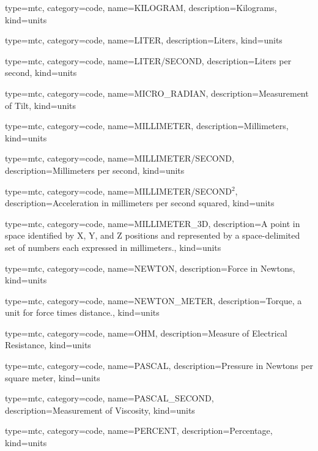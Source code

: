 {
  type=mtc,
  category=code,
  name={KILOGRAM},
  description={Kilograms},
  kind={units}
}


{
  type=mtc,
  category=code,
  name={LITER},
  description={Liters},
  kind={units}
}


{
  type=mtc,
  category=code,
  name={LITER/SECOND},
  description={Liters per second},
  kind={units}
}


{
  type=mtc,
  category=code,
  name={MICRO\_RADIAN},
  description={Measurement of Tilt},
  kind={units}
}


{
  type=mtc,
  category=code,
  name={MILLIMETER},
  description={Millimeters},
  kind={units}
}


{
  type=mtc,
  category=code,
  name={MILLIMETER/SECOND},
  description={Millimeters per second},
  kind={units}
}


{
  type=mtc,
  category=code,
  name={MILLIMETER/SECOND$^2$},
  description={Acceleration in millimeters per second squared},
  kind={units}
}


{
  type=mtc,
  category=code,
  name={MILLIMETER\_3D},
  description={A point in space identified by X, Y, and Z positions and represented by a space-delimited set of numbers each expressed in millimeters.},
  kind={units}
}


{
  type=mtc,
  category=code,
  name={NEWTON},
  description={Force in Newtons},
  kind={units}
}


{
  type=mtc,
  category=code,
  name={NEWTON\_METER},
  description={Torque, a unit for force times distance.},
  kind={units}
}


{
  type=mtc,
  category=code,
  name={OHM},
  description={Measure of Electrical Resistance},
  kind={units}
}


{
  type=mtc,
  category=code,
  name={PASCAL},
  description={Pressure in Newtons per square meter},
  kind={units}
}


{
  type=mtc,
  category=code,
  name={PASCAL\_SECOND},
  description={Measurement of Viscosity},
  kind={units}
}


{
  type=mtc,
  category=code,
  name={PERCENT},
  description={Percentage},
  kind={units}
}



